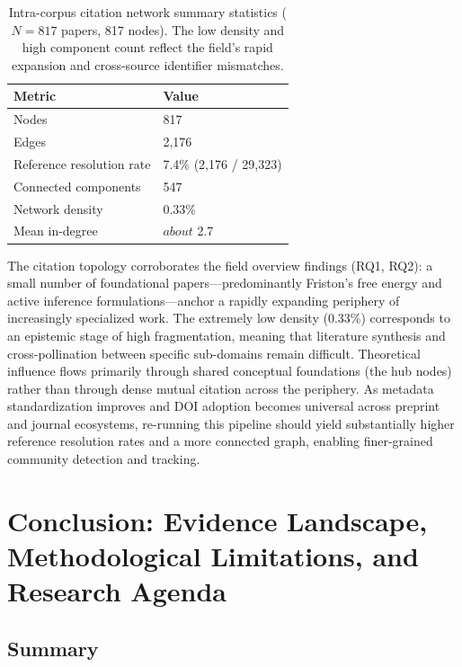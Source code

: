 \documentclass[
  english,
]{article}
\begin{document}
{{{{{{{{{{{{{{{{\begin{table}[htbp]
\centering
\caption{Intra-corpus citation network summary statistics ($N = 817$ papers, 817 nodes). The low density and high component count reflect the field's rapid expansion and cross-source identifier mismatches.}
\label{tab:citation_network}
\begin{tabular}{ll}
\toprule
\textbf{Metric} & \textbf{Value} \\
\midrule
Nodes & 817 \\
Edges & 2,176 \\
Reference resolution rate & 7.4\% (2,176 / 29,323) \\
Connected components & 547 \\
Network density & 0.33\% \\
Mean in-degree & $about$ 2.7 \\
\bottomrule
\end{tabular}
\end{table}

The citation topology corroborates the field overview findings (RQ1,
RQ2): a small number of foundational papers---predominantly Friston's
free energy and active inference formulations---anchor a rapidly
expanding periphery of increasingly specialized work. The extremely low
density (0.33\%) corresponds to an epistemic stage of high
fragmentation, meaning that literature synthesis and cross-pollination
between specific sub-domains remain difficult. Theoretical influence
flows primarily through shared conceptual foundations (the hub nodes)
rather than through dense mutual citation across the periphery. As
metadata standardization improves and DOI adoption becomes universal
across preprint and journal ecosystems, re-running this pipeline should
yield substantially higher reference resolution rates and a more
connected graph, enabling finer-grained community detection and
tracking.

\newpage

\section{\texorpdfstring{Conclusion: Evidence Landscape, Methodological
Limitations, and Research Agenda
\label{sec:conclusion}}{Conclusion: Evidence Landscape, Methodological Limitations, and Research Agenda}}\label{conclusion-evidence-landscape-methodological-limitations-and-research-agenda}

\subsection{Summary}\label{summary}

}}}}}}}}}}}}}}}}
\end{document}
